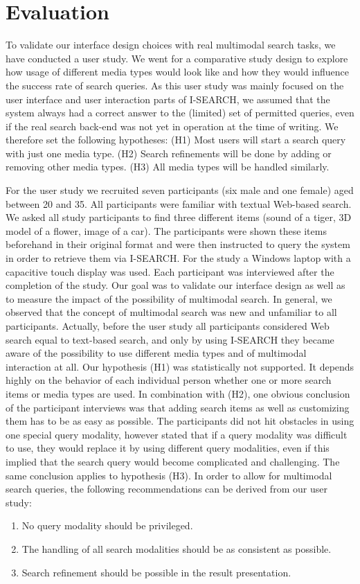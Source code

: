 \documentclass[runningheads,a4paper]{llncs} \usepackage[utf8]{inputenc}
\begin{document}
\section{Evaluation}
To validate our interface design choices with real multimodal search tasks, we have conducted a user study. We went for a comparative study design to explore how usage of different media types would look like and how they would influence the success rate of search queries. As this user study was mainly focused on the user interface and user interaction parts of \mbox{I-SEARCH}, we assumed that the system always had a correct answer to the (limited) set of permitted queries, even if the real search back-end was not yet in operation at the time of writing. We therefore set the following hypotheses: (H1) Most users will start a search query with just one media type. (H2) Search refinements will be done by adding or removing other media types. (H3) All media types will be handled similarly.

For the user study we recruited seven participants (six male and one female) aged between 20 and 35. All participants were familiar with textual Web-based search. We asked all study participants to find three different items (sound of
a tiger, 3D model of a flower, image of a car). The participants were shown these items beforehand in their original format and were then instructed to query the system in order to retrieve them via \mbox{I-SEARCH}. For the study a Windows laptop with a capacitive touch display was used. Each participant was interviewed after the completion of the study. Our goal was to validate our interface design as well as to measure the impact of the possibility of multimodal search. In general, we observed that the concept of multimodal search was new and unfamiliar to all participants. Actually, before the user study all participants considered Web search equal to text-based search, and only by using \mbox{I-SEARCH} they became aware of the possibility to use different media types and of multimodal interaction at all. Our hypothesis (H1) was statistically not supported. It depends highly on the behavior of each individual person whether one or more search items or media types are used. In combination with (H2), one obvious conclusion of the participant interviews was that adding search items as well as customizing them has to be as easy as possible. The participants did not hit obstacles in using one special query modality, however stated that if a query modality was
difficult to use, they would replace it by using different query modalities, even if this implied that the search query would become complicated and challenging. The same conclusion applies to hypothesis (H3). In order to allow for  multimodal search queries, the following recommendations can be derived from our user study: 
\begin{enumerate}
  \item No query modality should be privileged.
  \item The handling of all search modalities should be as consistent as possible.
  \item Search refinement should be possible in the result presentation.  
\end{enumerate}
\end{document}
